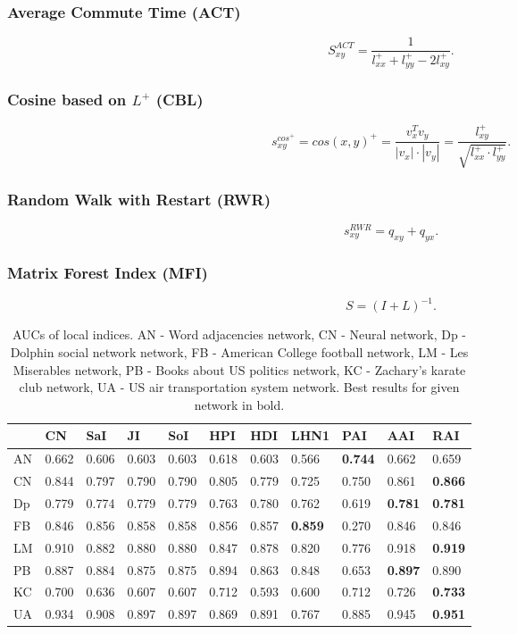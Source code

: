 \documentclass{llncs}
\begin{document}
\subsubsection{Average Commute Time (ACT)}
%
$$S_{xy}^{ACT} = \frac{1}{l_{xx}^{+} + l_{yy}^{+} - 2l_{xy}^{+}}.$$
%
\subsubsection{Cosine based on $L^+$ (CBL)}
%
$$s_{xy}^{cos^{+}} = cos(x, y)^{+} = \frac{v_x^T v_y}{|v_x| \cdot |v_y|} = \frac{l_{xy}^{+}}{\sqrt{l_{xx}^{+}\cdot l_{yy}^{+}}}.$$
%
\subsubsection{Random Walk with Restart (RWR)}
%
$$s_{xy}^{RWR} = q_{xy} + q_{yx}.$$
%
\subsubsection{Matrix Forest Index (MFI)}
%
$$S = (I + L)^{-1}.$$
%
\setlength{\tabcolsep}{5pt}
\renewcommand{\arraystretch}{1.5}
\begin{table}
\begin{center}
\caption{AUCs of local indices. AN - Word adjacencies network\cite{adjnoun-net}, CN - Neural network\cite{celneur-net}, Dp - Dolphin social network network\cite{dolph-net}, FB - American College football network\cite{foot-net}, LM - Les Miserables network\cite{lesmis-net}, PB - Books about US politics network\cite{polbook-net}, KC - Zachary's karate club network\cite{karate-net}, UA - US air transportation system network\cite{usair-net}. Best results for given network in bold.}
\begin{tabular}{| l | l | l | l | l | l | l | l | l | l | l |}
\hline
& CN & SaI & JI & SoI & HPI & HDI & LHN1 & PAI & AAI & RAI \\ \hline
AN & 0.662 & 0.606 & 0.603 & 0.603 & 0.618 & 0.603 & 0.566 & \textbf{0.744} & 0.662 & 0.659 \\ \hline
CN & 0.844 & 0.797 & 0.790 & 0.790 & 0.805 & 0.779 & 0.725 & 0.750 & 0.861 & \textbf{0.866} \\ \hline
Dp & 0.779 & 0.774 & 0.779 & 0.779 & 0.763 & 0.780 & 0.762 & 0.619 & \textbf{0.781} & \textbf{0.781} \\ \hline
FB & 0.846 & 0.856 & 0.858 & 0.858 & 0.856 & 0.857 & \textbf{0.859} & 0.270 & 0.846 & 0.846 \\ \hline
LM & 0.910 & 0.882 & 0.880 & 0.880 & 0.847 & 0.878 & 0.820 & 0.776 & 0.918 & \textbf{0.919} \\ \hline
PB & 0.887 & 0.884 & 0.875 & 0.875 & 0.894 & 0.863 & 0.848 & 0.653 & \textbf{0.897} & 0.890 \\ \hline
KC & 0.700 & 0.636 & 0.607 & 0.607 & 0.712 & 0.593 & 0.600 & 0.712 & 0.726 & \textbf{0.733} \\ \hline
UA & 0.934 & 0.908 & 0.897 & 0.897 & 0.869 & 0.891 & 0.767 & 0.885 & 0.945 & \textbf{0.951} \\ 
\hline
\end{tabular}
\end{center}
\end{table}
\end{document}
